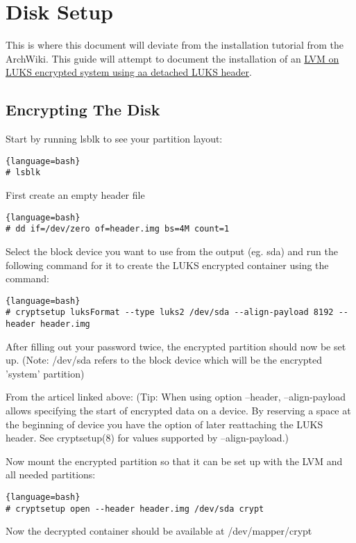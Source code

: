 
\section{Disk Setup}
This is where this document will deviate from the installation tutorial from the ArchWiki. This guide will attempt to document the installation of an  \href{https://wiki.archlinux.org/index.php/Dm-crypt/Specialties#Encrypted_system_using_a_detached_LUKS_header}{LVM on LUKS encrypted system using aa detached LUKS header}.

\subsection{Encrypting The Disk}
Start by running lsblk to see your partition layout:
\begin{lstlisting}{language=bash}
# lsblk
\end{lstlisting}
First create an empty header file
\begin{lstlisting}{language=bash}
# dd if=/dev/zero of=header.img bs=4M count=1
\end{lstlisting}
Select the block device you want to use from the output (eg. sda) and run the following command for it to create the LUKS encrypted container using the command:

\begin{lstlisting}{language=bash}
# cryptsetup luksFormat --type luks2 /dev/sda --align-payload 8192 --header header.img
\end{lstlisting}
After filling out your password twice, the encrypted partition should now be set up.
(Note: /dev/sda refers to the block device which will be the encrypted 'system' partition)

From the articel linked above: (Tip: When using option --header, --align-payload allows specifying the start of encrypted data on a device. By reserving a space at the beginning of device you have the option of later reattaching the LUKS header. See cryptsetup(8) for values supported by --align-payload.)

Now mount the encrypted partition so that it can be set up with the LVM and all needed partitions:
\begin{lstlisting}{language=bash}
# cryptsetup open --header header.img /dev/sda crypt
\end{lstlisting}
Now the decrypted container should be available at /dev/mapper/crypt

